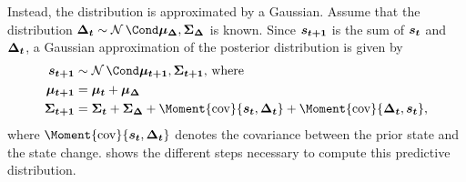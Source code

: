 Instead, the distribution is approximated by a Gaussian.
Assume that the distribution $\rv{\Delta_t} \sim \Gaussian{\mat{\mu_\Delta}, \mat{\Sigma_\Delta}}$ is known.
Since $\bm{s_{t+1}}$ is the sum of $\bm{s_t}$ and $\bm{\Delta_t}$, a Gaussian approximation of the posterior distribution is given by
\begin{align}
    \begin{split}
        \rv{s_{t+1}} &\sim \Gaussian{\mat{\mu_{t+1}}, \mat{\Sigma_{t+1}}} \text{, where} \\
        \mat{\mu_{t+1}} &= \mat{\mu_t} + \mat{\mu_\Delta} \\
        \mat{\Sigma_{t+1}} &= \mat{\Sigma_t} + \mat{\Sigma_\Delta} + \Moment{\cov}{\rv{s_t}, \rv{\Delta_t}} + \Moment{\cov}{\rv{\Delta_t}, \rv{s_t}},
    \end{split}
\end{align}
where $\Moment{\cov}{\rv{s_t}, \rv{\Delta_t}}$ denotes the covariance between the prior state and the state change.
 shows the different steps necessary to compute this predictive distribution.


